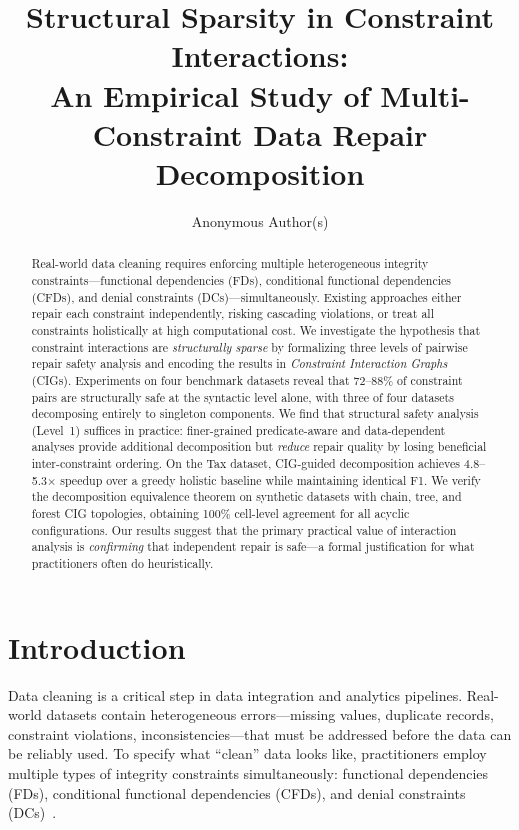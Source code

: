 \documentclass{article}
\title{Structural Sparsity in Constraint Interactions:\\An Empirical Study of Multi-Constraint Data Repair Decomposition}
\author{
  Anonymous Author(s)
}
\begin{document}
\maketitle

\begin{abstract}
Real-world data cleaning requires enforcing multiple heterogeneous integrity constraints---functional dependencies (FDs), conditional functional dependencies (CFDs), and denial constraints (DCs)---simultaneously.
Existing approaches either repair each constraint independently, risking cascading violations, or treat all constraints holistically at high computational cost.
We investigate the hypothesis that constraint interactions are \emph{structurally sparse} by formalizing three levels of pairwise repair safety analysis and encoding the results in \emph{Constraint Interaction Graphs} (CIGs).
Experiments on four benchmark datasets reveal that 72--88\% of constraint pairs are structurally safe at the syntactic level alone, with three of four datasets decomposing entirely to singleton components.
We find that structural safety analysis (Level~1) suffices in practice: finer-grained predicate-aware and data-dependent analyses provide additional decomposition but \emph{reduce} repair quality by losing beneficial inter-constraint ordering.
On the Tax dataset, CIG-guided decomposition achieves 4.8--5.3$\times$ speedup over a greedy holistic baseline while maintaining identical F1.
We verify the decomposition equivalence theorem on synthetic datasets with chain, tree, and forest CIG topologies, obtaining 100\% cell-level agreement for all acyclic configurations.
Our results suggest that the primary practical value of interaction analysis is \emph{confirming} that independent repair is safe---a formal justification for what practitioners often do heuristically.
\end{abstract}

\section{Introduction}
\label{sec:intro}

Data cleaning is a critical step in data integration and analytics pipelines. Real-world datasets contain heterogeneous errors---missing values, duplicate records, constraint violations, inconsistencies---that must be addressed before the data can be reliably used. To specify what ``clean'' data looks like, practitioners employ multiple types of integrity constraints simultaneously: functional dependencies (FDs), conditional functional dependencies (CFDs), and denial constraints (DCs)~\citep{ilyas2019data}.
\end{document}
